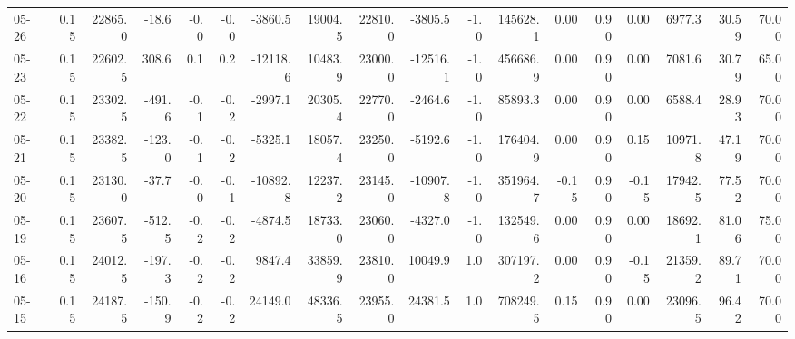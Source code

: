 \begin{threeparttable}
{\begin{tabular}{lrrrrrrrrrrrrrrrrr}
  05-26 &     0.15 & 22865.0 &             -18.6 &              -0.0 &               -0.0 &            -3860.5 & 19004.5 & 22810.0 &    -3805.5 &                     -1.0 &            145628.1 &       0.00 &      0.90 &           0.00 &           6977.3 &           30.59 &                  70.00 \\
  05-23 &     0.15 & 22602.5 &             308.6 &               0.1 &                0.2 &           -12118.6 & 10483.9 & 23000.0 &   -12516.1 &                     -1.0 &            456686.9 &       0.00 &      0.90 &           0.00 &           7081.6 &           30.79 &                  65.00 \\
  05-22 &     0.15 & 23302.5 &            -491.6 &              -0.1 &               -0.2 &            -2997.1 & 20305.4 & 22770.0 &    -2464.6 &                     -1.0 &             85893.3 &       0.00 &      0.90 &           0.00 &           6588.4 &           28.93 &                  70.00 \\
  05-21 &     0.15 & 23382.5 &            -123.0 &              -0.1 &               -0.2 &            -5325.1 & 18057.4 & 23250.0 &    -5192.6 &                     -1.0 &            176404.9 &       0.00 &      0.90 &           0.15 &          10971.8 &           47.19 &                  70.00 \\
  05-20 &     0.15 & 23130.0 &             -37.7 &              -0.0 &               -0.1 &           -10892.8 & 12237.2 & 23145.0 &   -10907.8 &                     -1.0 &            351964.7 &      -0.15 &      0.90 &          -0.15 &          17942.5 &           77.52 &                  70.00 \\
  05-19 &     0.15 & 23607.5 &            -512.5 &              -0.2 &               -0.2 &            -4874.5 & 18733.0 & 23060.0 &    -4327.0 &                     -1.0 &            132549.6 &       0.00 &      0.90 &           0.00 &          18692.1 &           81.06 &                  75.00 \\
  05-16 &     0.15 & 24012.5 &            -197.3 &              -0.2 &               -0.2 &             9847.4 & 33859.9 & 23810.0 &    10049.9 &                      1.0 &            307197.2 &       0.00 &      0.90 &          -0.15 &          21359.2 &           89.71 &                  70.00 \\
  05-15 &     0.15 & 24187.5 &            -150.9 &              -0.2 &               -0.2 &            24149.0 & 48336.5 & 23955.0 &    24381.5 &                      1.0 &            708249.5 &       0.15 &      0.90 &           0.00 &          23096.5 &           96.42 &                  70.00 \\

\end{tabular}}
\end{threeparttable}
